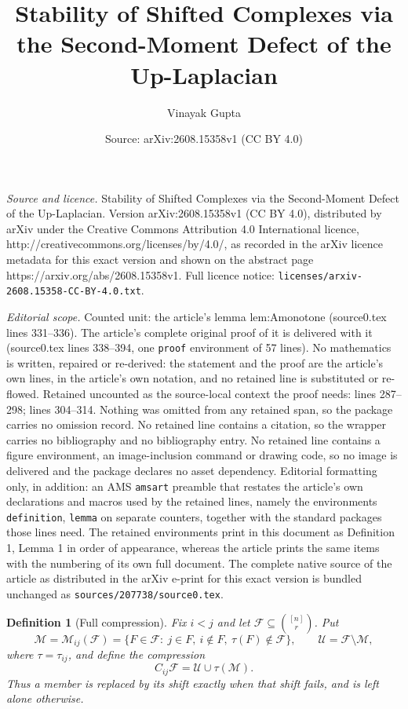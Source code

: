 \documentclass[10pt,a4paper]{amsart}
\title{Stability of Shifted Complexes via the Second-Moment Defect of the Up-Laplacian}
\author{Vinayak Gupta}
\date{Source: arXiv:2608.15358v1 (CC BY 4.0)}
\newtheorem{definition}{Definition}
\newcommand{\F}{\mathcal{F}}
\newcommand{\M}{\mathcal{M}}
\newcommand{\Uu}{\mathcal{U}}
\begin{document}
\maketitle

\noindent\emph{Source and licence.} Stability of Shifted Complexes via the Second-Moment Defect of the Up-Laplacian. Version arXiv:2608.15358v1 (CC BY 4.0), distributed by arXiv under the Creative Commons Attribution 4.0 International licence, http://creativecommons.org/licenses/by/4.0/, as recorded in the arXiv licence metadata for this exact version and shown on the abstract page https://arxiv.org/abs/2608.15358v1. Full licence notice: \texttt{licenses/arxiv-2608.15358-CC-BY-4.0.txt}.\par\smallskip

\noindent\textit{Editorial scope.} Counted unit: the article's lemma lem:Amonotone (source0.tex lines 331--336). The article's complete original proof of it is delivered with it (source0.tex lines 338--394, one \texttt{proof} environment of 57 lines). No mathematics is written, repaired or re-derived: the statement and the proof are the article's own lines, in the article's own notation, and no retained line is substituted or re-flowed.  Retained uncounted as the source-local context the proof needs: lines 287--298; lines 304--314.  Nothing was omitted from any retained span, so the package carries no omission record.  No retained line contains a citation, so the wrapper carries no bibliography and no bibliography entry.  No retained line contains a figure environment, an image-inclusion command or drawing code, so no image is delivered and the package declares no asset dependency.  Editorial formatting only, in addition: an AMS \texttt{amsart} preamble that restates the article's own declarations and macros used by the retained lines, namely the environments \texttt{definition}, \texttt{lemma} on separate counters, together with the standard packages those lines need.  The retained environments print in this document as Definition 1, Lemma 1 in order of appearance, whereas the article prints the same items with the numbering of its own full document.  The complete native source of the article as distributed in the arXiv e-print for this exact version is bundled unchanged as \texttt{sources/207738/source0.tex}.
\begin{definition}[Full compression]\label{def:compression}
Fix $i<j$ and let $\F\subseteq\binom{[n]}{r}$. Put
\[
\M=\M_{ij}(\F)=\{F\in\F:\ j\in F,\ i\notin F,\ \tau(F)\notin\F\},\qquad
\Uu=\F\setminus\M,
\]
where $\tau=\tau_{ij}$, and define the \emph{compression}
\[
C_{ij}\F=\Uu\cup\tau(\M).
\]
Thus a member is replaced by its shift exactly when that shift fails, and is left alone otherwise.
\end{definition}
\end{document}
